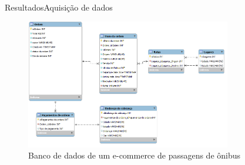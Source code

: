 \begin{frame}{Resultados}{Aquisição de dados}
\begin{center}
\begin{figure}[ht]
    \includegraphics[width=0.8\textwidth]{../img/estrutura-banco-de-dados}
    \caption{Banco de dados de um e-commerce de passagens de ônibus}
    \label{fig:bd-clickbus}
\end{figure}
\end{center}
\end{frame}